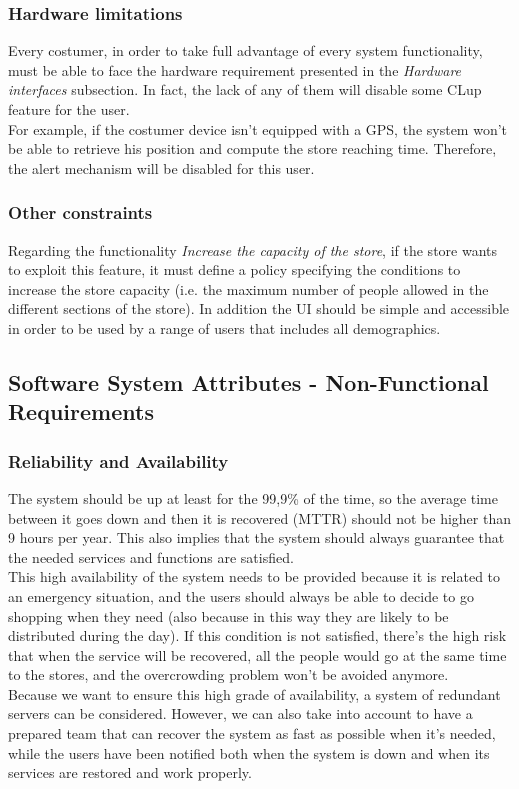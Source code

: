 \documentclass[]{article}
\begin{document}
		\subsubsection{Hardware limitations}
		Every costumer, in order to take full advantage of every system functionality, must be able to face the hardware requirement presented in the \textit{Hardware interfaces} subsection. In fact, the lack of any of them will disable some CLup feature for the user. \\
		For example, if the costumer device isn't equipped with a GPS, the system won't be able to retrieve his position and compute the store reaching time. Therefore, the alert mechanism will be disabled for this user.
		
		\subsubsection{Other constraints}
		Regarding the functionality \textit{Increase the capacity of the store}, if the store wants to exploit this feature, it must define a policy specifying the conditions to increase the store capacity (i.e. the maximum number of people allowed in the different sections of the store).
		\newline
		In addition the UI should be simple and accessible in order to be used by a range of users that includes all demographics.
			

		 
		\subsection{Software System Attributes - Non-Functional Requirements}
			\subsubsection{Reliability and Availability}
			
			The  system should be up at least for the 99,9\% of the time, so the average time between it goes down and then it is recovered (MTTR) should not be higher than 9 hours per year. This also implies that the system should always guarantee that the needed services and functions are satisfied.\\
This high availability of the system needs to be provided because it is related to an emergency situation, and the users should always be able to decide to go shopping when they need (also because in this way they are likely to be distributed during the day). If this condition is not satisfied, there’s the high risk that when the service will be recovered,  all the people would go at the same time to the stores, and the overcrowding problem won’t be avoided anymore.\\
Because we want to ensure this high grade of availability, a system of redundant servers can be considered. However, we can also take into account to have a prepared team that can recover the system as fast as possible when it’s needed, while the users have been notified both when the system is down and when its services are restored and work properly.\\
\end{document}
